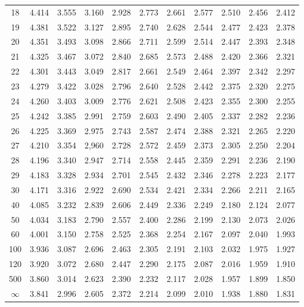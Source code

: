 \documentclass[12pt]{article}
\begin{document}
\begin{table}
\begin{center}
{\begin{tabular}{|c|c|c|c|c|c|c|c|c|c|c|}
	18& 4.414& 3.555& 3.160 &2.928 &  2.773 &2.661 &2.577 &2.510 &2.456& 2.412\\
	19 &4.381 &3.522 &3.127& 2.895 &2.740 &2.628 &2.544 &2.477 &2.423 &2.378\\
	20& 4.351&3.493 &3.098 &2.866 &2.711 &  2.599 &  2.514 &2.447 &2.393& 2.348\\
	21& 4.325& 3.467& 3.072& 2.840 &  2.685 & 2.573& 2.488& 2.420& 2.366& 2.321\\
	22& 4.301& 3.443& 3.049& 2.817 &2.661 &2.549 &  2.464 &2.397& 2.342& 2.297\\
	23& 4.279 &3.422& 3.028& 2.796& 2.640 &  2.528 &2.442 &2.375 &2.320 &2.275 \\
	24 &4.260 &3.403 &3.009 &2.776 &2.621 & 2.508 &  2.423 &2.355& 2.300& 2.255\\
	25& 4.242 &3.385 &2.991 &2.759 & 2.603 & 2.490 &2.405 &2.337 &2.282 &2.236\\
	26 &4.225 &3.369 &2.975 &2.743& 2.587 &2.474& 2.388 &2.321 &2.265& 2.220 \\
	27 &4.210 &3.354 &2,960 &2.728 &2.572 &2.459 &2.373 &2.305 &2.250 &2.204\\
	28 &4.196 &3.340& 2.947 &2.714 &2.558 &2.445 &2.359 &2.291 &2.236 &2.190\\
	29 &4.183& 3.328 &2.934 &2.701 &2.545 &2.432 &2.346 &2.278 &2.223 &2.177\\
	30 &4.171 &3.316 &2.922 &2.690 &2.534 &2.421 &2.334 & 2.266& 2.211 &2.165\\
	40 &4.085 &3.232 &2.839 &2.606 &2.449 &2.336 &2.249 & 2.180 & 2.124 &2.077\\
	50 &4.034 &3.183& 2.790& 2.557 &2.400 &2.286 &2.199 &2.130 &2.073 &2.026 \\
	60 &4.001& 3.150 &2.758 &2.525 &2.368 &2.254 &2.167 &2.097 &2.040 &1.993\\
	100& 3.936& 3.087 &2.696 &2.463 &2.305 &2.191 &2.103 &2.032 &1.975 &1.927\\
	120& 3.920 &3.072& 2.680& 2.447 &2.290 &2.175 &2.087 &2.016& 1.959 &  1.910\\
	500& 3.860 &3.014 &2.623 &2.390 &2.232& 2.117 &2.028 &1.957& 1.899& 1.850\\ \hline
	$\infty$ & 3.841& 2.996 &2.605 &2.372 &2.214 &2.099 &2.010 &1.938 &1.880
	&1.831\\
	\hline
\end{tabular}
}
\end{center}
\end{table}

\end{document}
